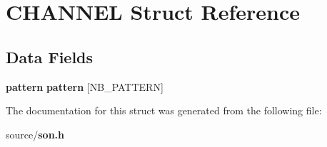 \section{CHANNEL Struct Reference}
\label{struct_c_h_a_n_n_e_l}
\subsection*{Data Fields}
\begin{DoxyCompactItemize}
\item 
{\bf pattern} {\bfseries pattern} [NB\_\-PATTERN]\label{struct_c_h_a_n_n_e_l_a53f2466b091fec98fcbcda68249747ca}

\end{DoxyCompactItemize}


The documentation for this struct was generated from the following file:\begin{DoxyCompactItemize}
\item 
source/{\bf son.h}\end{DoxyCompactItemize}
